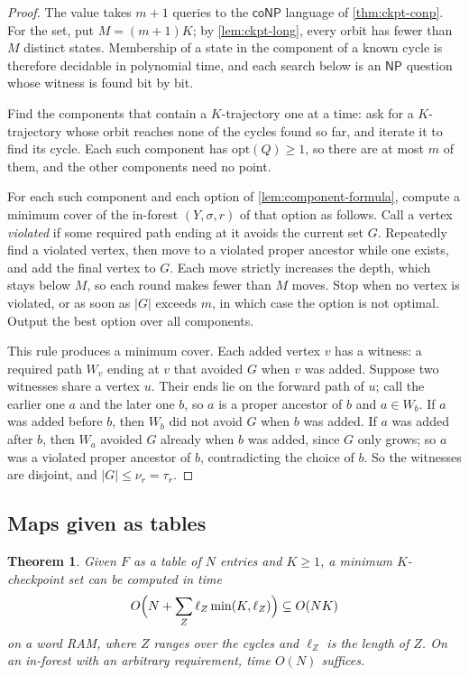 \documentclass[11pt]{article}
\newtheorem{theorem}{Theorem}[section]
\theoremstyle{definition}
\theoremstyle{remark}
\numberwithin{equation}{section}
\begin{document}
\begin{proof}
The value takes $m+1$ queries to the $\mathsf{coNP}$ language of
\cref{thm:ckpt-conp}.  For the set, put $M=(m+1)K$; by
\cref{lem:ckpt-long}, every orbit has fewer than $M$ distinct states.
Membership of a state in the component of a known cycle is therefore
decidable in polynomial time, and each search below is an $\mathsf{NP}$
question whose witness is found bit by bit.

Find the components that contain a $K$-trajectory one at a time: ask for
a $K$-trajectory whose orbit reaches none of the cycles found so far, and
iterate it to find its cycle.  Each such component has
$\mathrm{opt}(Q)\geq1$, so there are at most $m$ of them, and the other
components need no point.

For each such component and each option of \cref{lem:component-formula},
compute a minimum cover of the in-forest $(Y,\sigma,r)$ of that option as
follows.  Call a vertex \emph{violated} if some required path ending at
it avoids the current set $G$.  Repeatedly find a violated vertex, then
move to a violated proper ancestor while one exists, and add the final
vertex to $G$.  Each move strictly increases the depth, which stays
below $M$, so each round makes fewer than $M$ moves.  Stop when no vertex is violated,
or as soon as $|G|$ exceeds $m$, in which case the option is not optimal.
Output the best option over all components.

This rule produces a minimum cover.  Each added vertex $v$ has a
witness: a required path $W_v$ ending at $v$ that avoided $G$ when $v$ was
added.  Suppose two witnesses share a vertex $u$.  Their ends lie on the
forward path of $u$; call the earlier one $a$ and the later one $b$, so
$a$ is a proper ancestor of $b$ and $a\in W_b$.  If $a$ was added before
$b$, then $W_b$ did not avoid $G$ when $b$ was added.  If $a$ was added
after $b$, then $W_a$ avoided $G$ already when $b$ was added, since $G$
only grows; so $a$ was a violated proper ancestor of $b$, contradicting
the choice of $b$.  So the witnesses are disjoint, and
$|G|\leq\nu_r=\tau_r$.
\end{proof}

\subsection{Maps given as tables}

\begin{theorem}\label{thm:ckpt-table}
Given $F$ as a table of $N$ entries and $K\geq1$, a minimum
$K$-checkpoint set can be computed in time
\[
  O\Bigl(N+\sum_Z \ell_Z\min(K,\ell_Z)\Bigr)\subseteq O(NK)
\]
on a word RAM, where $Z$ ranges over the cycles and $\ell_Z$ is the length
of $Z$.  On an in-forest with an arbitrary requirement, time $O(N)$
suffices.
\end{theorem}
\end{document}
